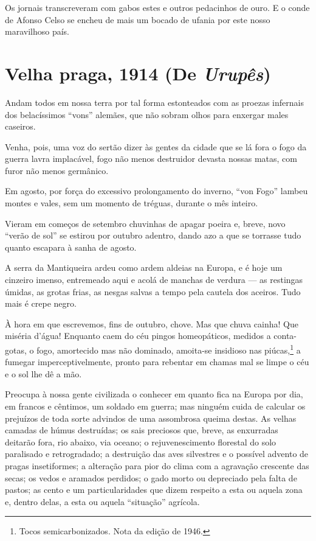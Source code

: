 Os jornais transcreveram com gabos estes e outros pedacinhos de ouro. E
o conde de Afonso Celso se encheu de mais um bocado de ufania por este
nosso maravilhoso país.

\chapter{Velha praga, 1914 (De \emph{Urupês})}

Andam todos em nossa terra por tal forma estonteados com as proezas
infernais dos belacíssimos ``vons'' alemães, que não sobram olhos para
enxergar males caseiros.

Venha, pois, uma voz do sertão dizer às gentes da cidade que se lá fora
o fogo da guerra lavra implacável, fogo não menos destruidor devasta
nossas matas, com furor não menos germânico.

Em agosto, por força do excessivo prolongamento do inverno, ``von Fogo''
lambeu montes e vales, sem um momento de tréguas, durante o mês inteiro.

Vieram em começos de setembro chuvinhas de apagar poeira e, breve, novo
``verão de sol'' se estirou por outubro adentro, dando azo a que se
torrasse tudo quanto escapara à sanha de agosto.

A serra da Mantiqueira ardeu como ardem aldeias na Europa, e é hoje um
cinzeiro imenso, entremeado aqui e acolá de manchas de verdura --- as
restingas úmidas, as grotas frias, as nesgas salvas a tempo pela cautela
dos aceiros. Tudo mais é crepe negro.

À hora em que escrevemos, fins de outubro, chove. Mas que chuva cainha!
Que miséria d'água! Enquanto caem do céu pingos homeopáticos, medidos a
conta-gotas, o fogo, amortecido mas não dominado, amoita-se insidioso
nas piúcas,\footnote{Tocos semicarbonizados. Nota da edição de 1946.} a
fumegar imperceptivelmente, pronto para rebentar em chamas mal se limpe
o céu e o sol lhe dê a mão.

Preocupa à nossa gente civilizada o conhecer em quanto fica na Europa
por dia, em francos e cêntimos, um soldado em guerra; mas ninguém cuida
de calcular os prejuízos de toda sorte advindos de uma assombrosa queima
destas. As velhas camadas de húmus destruídas; os sais preciosos que,
breve, as enxurradas deitarão fora, rio abaixo, via oceano; o
rejuvenescimento florestal do solo paralisado e retrogradado; a
destruição das aves silvestres e o possível advento de pragas
insetiformes; a alteração para pior do clima com a agravação crescente
das secas; os vedos e aramados perdidos; o gado morto ou depreciado pela
falta de pastos; as cento e um particularidades que dizem respeito a
esta ou aquela zona e, dentro delas, a esta ou aquela ``situação''
agrícola.

